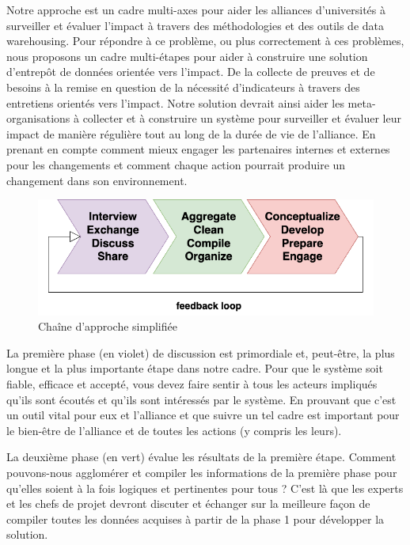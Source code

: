 Notre approche est un cadre multi-axes pour aider les alliances d'universités à surveiller et évaluer l'impact à travers des méthodologies et des outils de data warehousing. Pour répondre à ce problème, ou plus correctement à ces problèmes, nous proposons un cadre multi-étapes pour aider à construire une solution d'entrepôt de données orientée vers l'impact. De la collecte de preuves et de besoins à la remise en question de la nécessité d'indicateurs à travers des entretiens orientés vers l'impact. Notre solution devrait ainsi aider les meta-organisations à collecter et à construire un système pour surveiller et évaluer leur impact de manière régulière tout au long de la durée de vie de l'alliance. En prenant en compte comment mieux engager les partenaires internes et externes pour les changements et comment chaque action pourrait produire un changement dans son environnement.

\begin{figure}[h]
    \centering
    \includegraphics[width=1\linewidth]{Modele_Latex_CNRIUT2025//images/Diagrams-Simplified framework chain Our approach.drawio.png}
    \caption{Chaîne d'approche simplifiée}
    \label{fig:approach-simplified}
\end{figure}

La première phase (en violet) de discussion est primordiale et, peut-être, la plus longue et la plus importante étape dans notre cadre. Pour que le système soit fiable, efficace et accepté, vous devez faire sentir à tous les acteurs impliqués qu'ils sont écoutés et qu'ils sont intéressés par le système. En prouvant que c'est un outil vital pour eux et l'alliance et que suivre un tel cadre est important pour le bien-être de l'alliance et de toutes les actions (y compris les leurs).

La deuxième phase (en vert) évalue les résultats de la première étape. Comment pouvons-nous agglomérer et compiler les informations de la première phase pour qu'elles soient à la fois logiques et pertinentes pour tous ? C'est là que les experts et les chefs de projet devront discuter et échanger sur la meilleure façon de compiler toutes les données acquises à partir de la phase 1 pour développer la solution.

